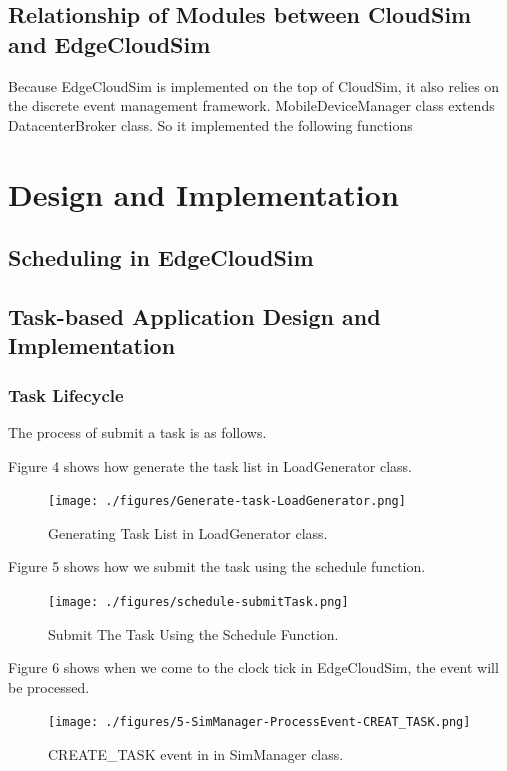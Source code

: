\subsection{Relationship of Modules between CloudSim and EdgeCloudSim}
Because EdgeCloudSim is implemented on the top of CloudSim, it also relies on the discrete event management framework. 
MobileDeviceManager class extends DatacenterBroker class. So it implemented the following functions


\section{Design and Implementation}

\subsection{Scheduling in EdgeCloudSim}


\subsection{Task-based Application Design and Implementation}

\subsubsection{Task Lifecycle}




The process of submit a task is as follows.


Figure 4 shows how generate the task list in LoadGenerator class.
\begin{figure}
	\centering
	\texttt{[image: ./figures/Generate-task-LoadGenerator.png]}
	\caption{\label{fig:frog}Generating Task List in LoadGenerator class.}
\end{figure}

Figure 5 shows how we submit the task using the schedule function.
\begin{figure}
	\centering
	\texttt{[image: ./figures/schedule-submitTask.png]}
	\caption{\label{fig:frog}Submit The Task Using the Schedule Function.}
\end{figure}


Figure 6 shows when we come to the clock tick in EdgeCloudSim, the event will be processed.
\begin{figure}
	\centering
	\texttt{[image: ./figures/5-SimManager-ProcessEvent-CREAT\_TASK.png]}
	\caption{\label{fig:frog}CREATE\_TASK event in in SimManager class.}
\end{figure}

